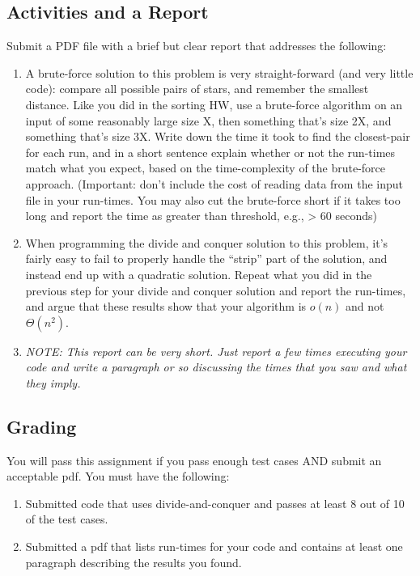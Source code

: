 \documentclass[11pt]{article}
\begin{document}
\subsection*{Activities and a Report}

Submit a PDF file with a brief but clear report that addresses the following:

\begin{enumerate}

\item A brute-force solution to this problem is very straight-forward (and very little code):  compare all possible pairs of stars, and remember the smallest distance. Like you did in the sorting HW, use a brute-force algorithm on an input of some reasonably large size X, then something that's size 2X, and something that's size 3X.  Write down the time it took to find the closest-pair for each run, and in a short sentence explain whether or not the run-times match what you expect, based on the time-complexity of the brute-force approach.  (Important: don't include the cost of reading data from the input file in your run-times. You may also cut the brute-force short if it takes too long and report the time as greater than threshold, e.g., > 60 seconds)

\item When programming the divide and conquer solution to this problem, it's fairly easy to fail to properly handle the ``strip'' part of the solution, and instead end up with a quadratic solution.  Repeat what you did in the previous step for your divide and conquer solution and report the run-times, and argue that these results show that your algorithm is $o(n)$ and not $\Theta(n^2)$.

\item {\em NOTE: This report can be very short. Just report a few times executing your code and write a paragraph or so discussing the times that you saw and what they imply.}

\end{enumerate}

\subsection*{Grading}

You will pass this assignment if you pass enough test cases AND submit an acceptable pdf. You must have the following:

\begin{enumerate}

\item Submitted code that uses divide-and-conquer and passes at least 8 out of 10 of the test cases.

\item Submitted a pdf that lists run-times for your code and contains at least one paragraph describing the results you found.

\end{enumerate} 
\end{document}
